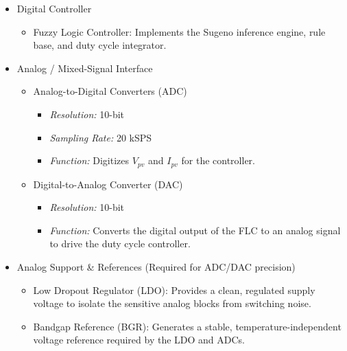 \documentclass[a4paper,oneside,12pt]{report}
\numberwithin{equation}{chapter}
\begin{document}
\begin{itemize}
    \item Digital Controller
    \begin{itemize}
        \item Fuzzy Logic Controller: Implements the Sugeno inference engine, rule base, and duty cycle integrator.
    \end{itemize}
    
    \item Analog / Mixed-Signal Interface
    \begin{itemize}
        \item Analog-to-Digital Converters (ADC)
        \begin{itemize}
            \item \textit{Resolution:} 10-bit
            \item \textit{Sampling Rate:} 20 kSPS
            \item \textit{Function:} Digitizes $V_{pv}$ and $I_{pv}$ for the controller.
        \end{itemize}
        \item Digital-to-Analog Converter (DAC)
        \begin{itemize}
            \item \textit{Resolution:} 10-bit
            \item \textit{Function:} Converts the digital output of the FLC to an analog signal to drive the duty cycle controller.
        \end{itemize}
    \end{itemize}

    \item Analog Support \& References (Required for ADC/DAC precision)
    \begin{itemize}
        \item Low Dropout Regulator (LDO): Provides a clean, regulated supply voltage to isolate the sensitive analog blocks from switching noise.
        \item Bandgap Reference (BGR): Generates a stable, temperature-independent voltage reference required by the LDO and ADCs.
    \end{itemize}
    

\end{itemize}
\end{document}
